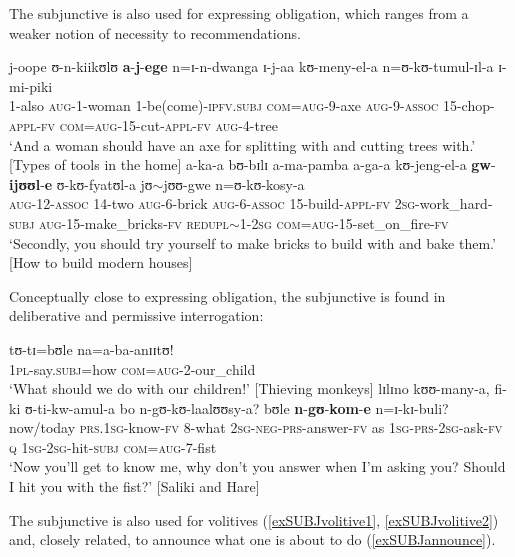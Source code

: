 The subjunctive is also used for expressing obligation, which ranges from a weaker notion of necessity to recommendations.
\begin{exe}
\ex \gll j-oope ʊ-n-kiikʊlʊ \textbf{a}-\textbf{j}-\textbf{ege} n=ɪ-n-dwanga ɪ-j-aa kʊ-meny-el-a n=ʊ-kʊ-tumul-ɪl-a ɪ-mi-piki\\
1-also \textsc{aug}-1-woman 1-be(come)-\textsc{ipfv.subj} \textsc{com}=\textsc{aug}-9-axe \textsc{aug}-9-\textsc{assoc} 15-chop-\textsc{appl}-\textsc{fv} \textsc{com}=\textsc{aug}-15-cut-\textsc{appl}-\textsc{fv} \textsc{aug}-4-tree\\
\glt \lq And a woman should have an axe for splitting with and cutting trees with.' [Types of tools in the home]
\ex \gll a-ka-a bʊ-bɪlɪ a-ma-pamba a-ga-a kʊ-jeng-el-a \textbf{gw}-\textbf{ijʊʊl}-\textbf{e} ʊ-kʊ-fyatʊl-a jʊ$\sim$jʊʊ-gwe n=ʊ-kʊ-kosy-a\\
\textsc{aug}-12-\textsc{assoc} \textsc{14}-two \textsc{aug}-6-brick \textsc{aug}-6-\textsc{assoc} 15-build-\textsc{appl}-\textsc{fv} \textsc{2sg}-work\_hard-\textsc{subj} \textsc{aug}-15-make\_bricks-\textsc{fv} \textsc{redupl}$\sim$1-\textsc{2sg} \textsc{com}=\textsc{aug}-15-set\_on\_fire-\textsc{fv}\\
\glt \lq ‎‎Secondly, you should try yourself to make bricks to build with and bake them.' [How to build modern houses]
\end{exe}

Conceptually close to expressing obligation, the subjunctive is found in deliberative and permissive interrogation:
\begin{exe}
\ex \gll tʊ-tɪ=bʊle na=a-ba-anɪɪtʊ!\\
\textsc{1pl}-say.\textsc{subj}=how \textsc{com}=\textsc{aug}-2-our\_child\\
\glt `‎‎What should we do with our children!' [Thieving monkeys]
\ex \gll lɪlɪno kʊʊ-many-a, fi-ki ʊ-ti-kw-amul-a bo n-gʊ-kʊ-laalʊʊsy-a? bʊle \textbf{n}-\textbf{gʊ}-\textbf{kom}-\textbf{e} n=ɪ-kɪ-buli?\\
now/today \textsc{prs}.\textsc{1sg}-know-\textsc{fv} 8-what \textsc{2sg}-\textsc{neg}-\textsc{prs}-answer-\textsc{fv} as \textsc{1sg}-\textsc{prs}-\textsc{2sg}-ask-\textsc{fv} \textsc{q} \textsc{1sg}-\textsc{2sg}-hit-\textsc{subj} \textsc{com}=\textsc{aug}-7-fist\\
\glt `Now you'll get to know me, why don't you answer when I'm asking you? Should I hit you with the fist?' [Saliki and Hare]
\end{exe}

The subjunctive is also used for volitives (\ref{exSUBJvolitive1}, \ref{exSUBJvolitive2}) and, closely related, to announce what one is about to do (\ref{exSUBJannounce}).

